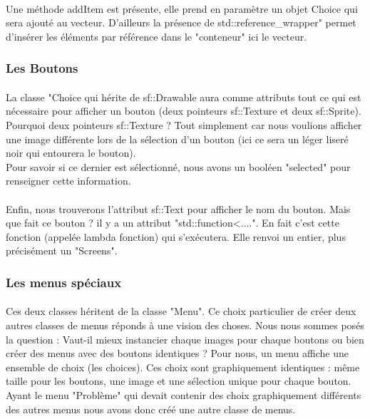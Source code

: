     	        \paragraph{} Une méthode addItem est présente, elle prend en paramètre un objet Choice qui sera ajouté au vecteur. D'ailleurs la présence de std::reference\_wrapper" permet d'insérer les éléments par référence dans le "conteneur" ici le vecteur. 
    	       
    	   \subsubsection{Les Boutons}
                \paragraph{}La classe "Choice qui hérite de sf::Drawable aura comme attributs tout ce qui est nécessaire pour afficher un bouton (deux pointeurs sf::Texture et deux sf::Sprite). Pourquoi deux pointeurs sf::Texture ? Tout simplement car nous voulions afficher une image différente lors de la sélection d'un bouton (ici ce sera un léger liseré noir qui entourera le bouton). \\
                Pour savoir si ce dernier est sélectionné, nous avons un booléen "selected" pour renseigner cette information. 
                
    	        \paragraph{}Enfin, nous trouverons l'attribut sf::Text pour afficher le nom du bouton. Mais que fait ce bouton ? il y a un attribut "std::function<....". En fait c'est cette fonction (appelée lambda fonction) qui s'exécutera. Elle renvoi un entier, plus précisément un "Screens".
    
    	   \subsubsection{Les menus spéciaux}
                \paragraph{}Ces deux classes héritent de la classe "Menu". Ce choix particulier de créer deux autres classes de menus réponds à une vision des choses. Nous nous sommes posés la question : Vaut-il mieux instancier chaque images pour chaque boutons ou bien créer des menus avec des boutons identiques ? Pour nous, un menu affiche une ensemble de choix (les choices). Ces choix sont graphiquement identiques : même taille pour les boutons, une image et une sélection unique pour chaque bouton. \\
                Ayant le menu "Problème" qui devait contenir des choix graphiquement différents des autres menus nous avons donc créé une autre classe de menus. 
                
